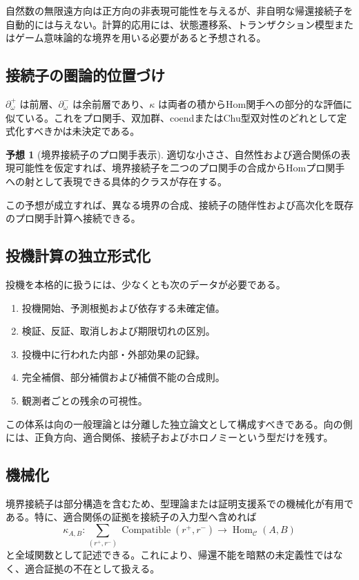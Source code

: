 \documentclass[a4paper,11pt]{ltjsarticle}
\theoremstyle{definition}
\newtheorem{conjecture}[definition]{予想}
\theoremstyle{plain}
\newcommand{\Hom}{\operatorname{Hom}}
\begin{document}
自然数の無限遠方向は正方向の非表現可能性を与えるが、非自明な帰還接続子を自動的には与えない。計算的応用には、状態遷移系、トランザクション模型またはゲーム意味論的な境界を用いる必要があると予想される。

\subsection{接続子の圏論的位置づけ}

$\partial_\omega^+$ は前層、$\partial_\omega^-$ は余前層であり、$\kappa$ は両者の積からHom関手への部分的な評価に似ている。これをプロ関手、双加群、coendまたはChu型双対性のどれとして定式化すべきかは未決定である。

\begin{conjecture}[境界接続子のプロ関手表示]
適切な小ささ、自然性および適合関係の表現可能性を仮定すれば、境界接続子を二つのプロ関手の合成からHomプロ関手への射として表現できる具体的クラスが存在する。
\end{conjecture}

この予想が成立すれば、異なる境界の合成、接続子の随伴性および高次化を既存のプロ関手計算へ接続できる。

\subsection{投機計算の独立形式化}

投機を本格的に扱うには、少なくとも次のデータが必要である。
\begin{enumerate}
 \item 投機開始、予測根拠および依存する未確定値。
 \item 検証、反証、取消しおよび期限切れの区別。
 \item 投機中に行われた内部・外部効果の記録。
 \item 完全補償、部分補償および補償不能の合成則。
 \item 観測者ごとの残余の可視性。
\end{enumerate}

この体系は向の一般理論とは分離した独立論文として構成すべきである。向の側には、正負方向、適合関係、接続子およびホロノミーという型だけを残す。

\subsection{機械化}

境界接続子は部分構造を含むため、型理論または証明支援系での機械化が有用である。特に、適合関係の証拠を接続子の入力型へ含めれば
\[
 \kappa_{A,B}:
 \sum_{(r^+,r^-)}
 \operatorname{Compatible}(r^+,r^-)
 \longrightarrow
 \Hom_{\mathcal C}(A,B)
\]
と全域関数として記述できる。これにより、帰還不能を暗黙の未定義性ではなく、適合証拠の不在として扱える。
\end{document}
